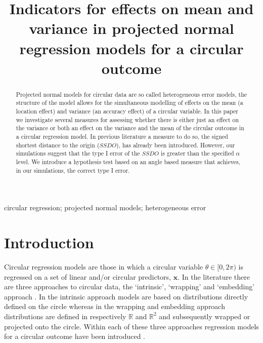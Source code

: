 \documentclass[]{interact}
\begin{document}
\articletype{}%

\title{Indicators for effects on mean and variance in projected normal regression models for a circular outcome}

\author{
}

\maketitle

\begin{abstract}
  Projected normal models for circular data are so called heterogeneous error
  models, the structure of the model allows for the simultaneous modelling of
  effects on the mean (a location effect) and variance (an accuracy effect) of a
  circular variable. In this paper we investigate several measures for assessing
  whether there is either just an effect on the variance or both an effect on
  the variance and the mean of the circular outcome in a circular regression
  model. In previous literature a measure to do so, the signed shortest distance
  to the origin ($SSDO$), has already been introduced. However, our simulations suggest
  that the type I error of the $SSDO$ is greater than the specified $\alpha$
  level. We introduce a hypothesis test based on an angle based measure that
  achieves, in our simulations, the correct type I error.
\end{abstract}

\begin{keywords}
circular regression; projected normal models; heterogeneous error
\end{keywords}


\section{Introduction}

Circular regression models are those in which a circular variable $\theta \in
[0, 2\pi)$ is regressed on a set of linear and/or circular predictors,
$\boldsymbol{x}$. In the literature there are three approaches to circular data,
the `intrinsic', `wrapping' and `embedding' approach \cite{mardia2000directional}.
In the intrinsic approach models are based on distributions directly defined on
the circle whereas in the wrapping and embedding approach distributions are
defined in respectively $\mathbb{R}$ and $\mathbb{R}^2$ and subsequently wrapped
or projected onto the circle. Within each of these three approaches regression
models for a circular outcome have been introduced \cite{fisher1992regression,
lagona2016regression, presnell1998projected, mulder2017bayesian,
ravindran2011bayesian, nunez2011bayesian}.
\end{document}
